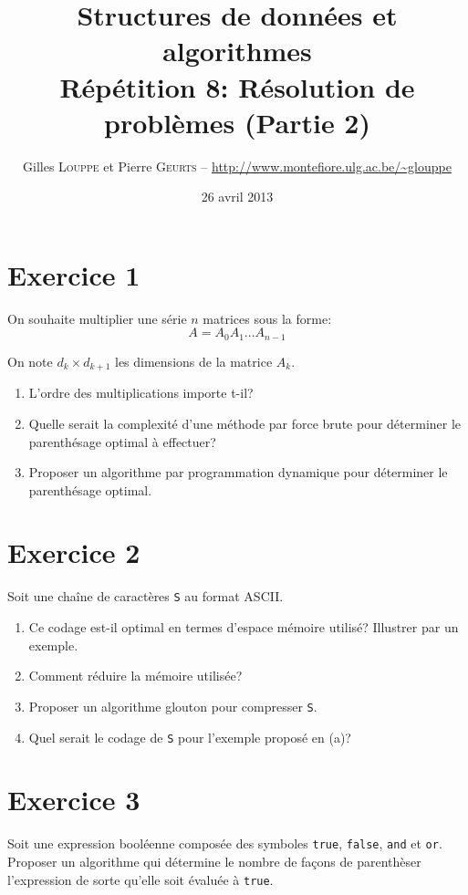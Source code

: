 \documentclass[a4paper,10pt]{article}
\title{
    \textbf{Structures de données et algorithmes}\\
    Répétition 8: Résolution de problèmes (Partie 2)
}
\author{Gilles \textsc{Louppe} et Pierre \textsc{Geurts} -- \url{http://www.montefiore.ulg.ac.be/~glouppe}}
\date{26 avril 2013}
\begin{document}
\maketitle




\section*{Exercice 1}

On souhaite multiplier une série $n$ matrices sous la forme: $$A = A_0 A_1 ... A_{n-1}$$

On note $d_k \times d_{k+1}$ les dimensions de la matrice $A_k$.

\begin{enumerate}
\item L'ordre des multiplications importe t-il?
\item Quelle serait la complexité d'une méthode par force brute pour déterminer le parenthésage optimal à effectuer?
\item Proposer un algorithme par programmation dynamique pour déterminer le parenthésage optimal.
\end{enumerate}


\section*{Exercice 2}

Soit une chaîne de caractères \texttt{S} au format ASCII.

\begin{enumerate}
\item Ce codage est-il optimal en termes d'espace mémoire utilisé? Illustrer par un exemple.
\item Comment réduire la mémoire utilisée?
\item Proposer un algorithme glouton pour compresser \texttt{S}.
\item Quel serait le codage de \texttt{S} pour l'exemple proposé en (a)?
\end{enumerate}


\section*{Exercice 3}


Soit une expression booléenne composée des symboles \texttt{true},
\texttt{false}, \texttt{and} et \texttt{or}. Proposer un algorithme qui
détermine le nombre de façons de parenthèser l'expression de sorte qu'elle soit
évaluée à \texttt{true}.
\end{document}
